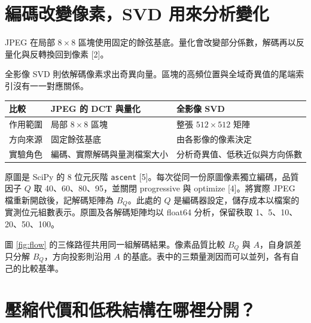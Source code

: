 \documentclass[12pt,a4paper,onecolumn]{article}
\begin{document}
\section{編碼改變像素，SVD 用來分析變化}
JPEG 在局部 $8\times8$ 區塊使用固定的餘弦基底。量化會改變部分係數，解碼再以反量化與反轉換回到像素 [2]。

\begin{samepage}
全影像 SVD 則依解碼像素求出奇異向量。區塊的高頻位置與全域奇異值的尾端索引沒有一一對應關係。
\end{samepage}

\par\medskip\noindent\begin{minipage}{\linewidth}
\settablecaption
\centering
\caption{本研究中 JPEG 與 SVD 的工作分工}
\begin{tabular}{@{}p{.20\linewidth}p{.36\linewidth}p{.36\linewidth}@{}}
\toprule
比較 & JPEG 的 DCT 與量化 & 全影像 SVD\\
\midrule
作用範圍 & 局部 $8\times8$ 區塊 & 整張 $512\times512$ 矩陣\\
方向來源 & 固定餘弦基底 & 由各影像的像素決定\\
實驗角色 & 編碼、實際解碼與量測檔案大小 & 分析奇異值、低秩近似與方向係數\\
\bottomrule
\end{tabular}
\end{minipage}\par\medskip

原圖是 SciPy 的 8 位元灰階 \texttt{ascent} [5]。每次從同一份原圖像素獨立編碼，品質因子 $Q$ 取 40、60、80、95，並關閉 progressive 與 optimize [4]。將實際 JPEG 檔重新開啟後，記解碼矩陣為 $B_Q$。此處的 $Q$ 是編碼器設定，儲存成本以檔案的實測位元組數表示。原圖及各解碼矩陣均以 float64 分析，保留秩取 1、5、10、20、50、100。

\begin{samepage}
圖 \ref{fig:flow} 的三條路徑共用同一組解碼結果。像素品質比較 $B_Q$ 與 $A$，自身誤差只分解 $B_Q$，方向投影則沿用 $A$ 的基底。表中的三類量測因而可以並列，各有自己的比較基準。
\end{samepage}

\section{壓縮代價和低秩結構在哪裡分開？}
\end{document}
